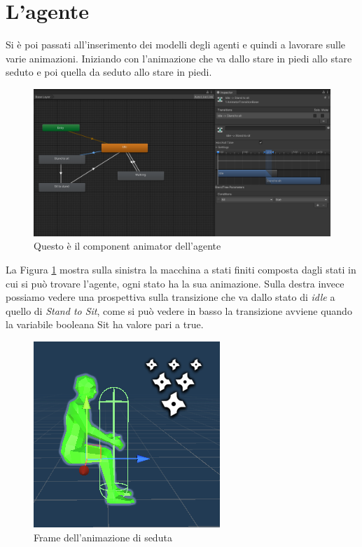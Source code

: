 \documentclass[12pt, openany]{book}
\begin{document}
	\section{L'agente}
	 Si è poi passati all'inserimento dei modelli degli agenti e quindi a lavorare sulle varie animazioni. Iniziando con l'animazione che va dallo stare in piedi allo stare seduto e poi quella da seduto allo stare in piedi.
	\begin{figure}[H]
		\centering
		\includegraphics[width=1\linewidth]{"Immagini/AgentAnimator.png"}
		\caption{Questo è il component animator dell'agente}
		\label{fig:AgentAnimator}
	\end{figure}
	La Figura \ref{fig:AgentAnimator} mostra sulla sinistra la macchina a stati finiti composta dagli stati in cui si può trovare l'agente, ogni stato ha la sua animazione. Sulla destra invece possiamo vedere una prospettiva sulla transizione che va dallo stato di \emph{idle} a quello di \emph{Stand to Sit}, come si può vedere in basso la transizione avviene quando la variabile booleana Sit ha valore pari a true.\\
	\begin{figure}[H]
		\centering
		\includegraphics[width=0.8\linewidth]{"Immagini/seduto.png"}
		\caption{Frame dell'animazione di seduta}
		\label{fig:Seduta}
	\end{figure}
\end{document}
